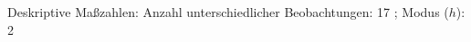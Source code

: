 				\label{tableValues:status}
				\vspace*{-\baselineskip}
                    \begin{noten}
                	    \note{} Deskriptive Maßzahlen:
                	    Anzahl unterschiedlicher Beobachtungen: 17%
                	    ; 
                	      Modus ($h$): 2
                     \end{noten}

